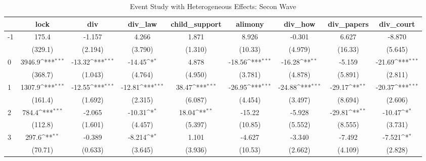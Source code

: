\documentclass{article}
\begin{document}
{
\def\sym#1{\ifmmode^{#1}\else\(^{#1}\)\fi}
\begin{longtable}{l*{8}{c}}
\caption{Event Study with Heterogeneous Effects: Secon Wave}\\
\hline\hline\endfirsthead\hline\endhead\hline\endfoot\endlastfoot
                &\multicolumn{1}{c}{lock}&\multicolumn{1}{c}{div}&\multicolumn{1}{c}{div\_law}&\multicolumn{1}{c}{child\_support}&\multicolumn{1}{c}{alimony}&\multicolumn{1}{c}{div\_how}&\multicolumn{1}{c}{div\_papers}&\multicolumn{1}{c}{div\_court}\\
\hline
-1              &    175.4         &   -1.157         &    4.266         &    1.871         &    8.926         &   -0.301         &    6.627         &   -8.870         \\
                &  (329.1)         &  (2.194)         &  (3.790)         &  (1.310)         &  (10.33)         &  (4.979)         &  (16.33)         &  (5.645)         \\
0               &   3946.9\sym{***}&   -13.32\sym{***}&   -14.45\sym{*}  &    4.878         &   -18.56\sym{***}&   -16.28\sym{**} &   -5.159         &   -21.69\sym{***}\\
                &  (368.7)         &  (1.043)         &  (4.764)         &  (4.950)         &  (3.781)         &  (4.878)         &  (5.891)         &  (2.811)         \\
1               &   1307.9\sym{***}&   -12.55\sym{***}&   -12.81\sym{***}&    38.47\sym{***}&   -26.95\sym{***}&   -24.88\sym{***}&   -29.17\sym{**} &   -20.37\sym{***}\\
                &  (161.4)         &  (1.692)         &  (2.315)         &  (6.087)         &  (4.454)         &  (3.497)         &  (8.694)         &  (2.606)         \\
2               &    784.4\sym{***}&   -2.065         &   -10.31\sym{*}  &    18.04\sym{**} &   -15.22         &   -5.928         &   -29.81\sym{**} &   -10.47\sym{*}  \\
                &  (112.8)         &  (1.601)         &  (4.457)         &  (5.397)         &  (10.85)         &  (5.552)         &  (8.555)         &  (3.731)         \\
3               &    297.6\sym{**} &   -0.389         &   -8.214\sym{*}  &    1.101         &   -4.627         &   -3.340         &   -7.492         &   -7.521\sym{*}  \\
                &  (70.71)         &  (0.633)         &  (3.645)         &  (3.936)         &  (10.53)         &  (2.662)         &  (4.109)         &  (2.828)         \\

\end{longtable}}
\end{document}
